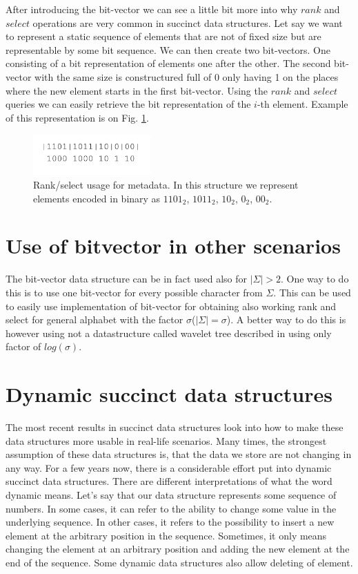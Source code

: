 After introducing the bit-vector we can see a little bit more into why $rank$ and $select$ operations are very common in succinct data structures. Let say we want to represent a static sequence of elements that are not of fixed size but are representable by some bit sequence.
We can then create two bit-vectors. One consisting of a bit representation of elements one after the other.
The second bit-vector with the same size is constructured full of 0 only having 1 on the places where the new element starts in the first bit-vector.
Using the $rank$ and $select$ queries we can easily retrieve the bit representation of the $i$-th element.
Example of this representation is on Fig. \ref{obr:obr_rank_select}.

\begin{figure}
\centerline{\includegraphics[width=0.4\textwidth]{images/obr_rank_select}}
\caption[Rank select usage in representation of sequence of elements with different size]{Rank/select usage for metadata. In this structure we represent elements encoded in binary as $1101_2$, $1011_2$, $10_2$, $0_2$, $00_2$.}
\label{obr:obr_rank_select}
\end{figure}

\section{Use of bitvector in other scenarios}

The bit-vector data structure can be in fact used also for $|\Sigma|>2$. One way to do this is to use one bit-vector for every possible character from $\Sigma$. This can be used to easily use implementation of bit-vector for obtaining also working rank and select for general alphabet with the factor $\sigma$($|\Sigma|=\sigma$). A better way to do this is however using not a datastructure called wavelet tree described in \cite{grossi2003high} using only factor of $log(\sigma)$.

\section{Dynamic succinct data structures}

The most recent results in succinct data structures look into how to make these data structures more usable in real-life scenarios. Many times, the
strongest assumption of these data structures is, that the data we store are not changing in any way. For a few years now, there is a considerable effort put into dynamic succinct data structures. There are different interpretations of what the word dynamic means. Let's say that our data structure represents some sequence of numbers. In some cases, it can refer to the ability to change some value in the underlying sequence. In other cases, it refers to the possibility to insert a new element at the arbitrary position in the sequence. Sometimes, it only means changing the element at an arbitrary position and adding the new element at the end of the sequence. Some dynamic data structures also allow deleting of element.

